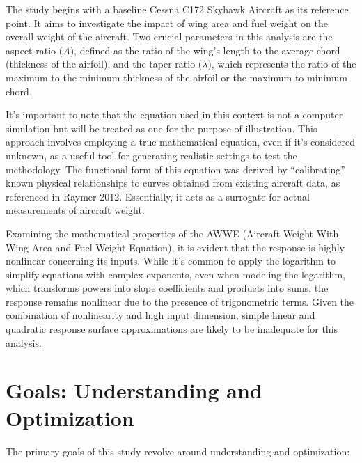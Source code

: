 \documentclass[
  letterpaper,
  DIV=11,
  numbers=noendperiod]{scrreprt}
\begin{document}
The study begins with a baseline Cessna C172 Skyhawk Aircraft as its
reference point. It aims to investigate the impact of wing area and fuel
weight on the overall weight of the aircraft. Two crucial parameters in
this analysis are the aspect ratio (\(A\)), defined as the ratio of the
wing's length to the average chord (thickness of the airfoil), and the
taper ratio (\(\lambda\)), which represents the ratio of the maximum to
the minimum thickness of the airfoil or the maximum to minimum chord.

It's important to note that the equation used in this context is not a
computer simulation but will be treated as one for the purpose of
illustration. This approach involves employing a true mathematical
equation, even if it's considered unknown, as a useful tool for
generating realistic settings to test the methodology. The functional
form of this equation was derived by ``calibrating'' known physical
relationships to curves obtained from existing aircraft data, as
referenced in Raymer 2012. Essentially, it acts as a surrogate for
actual measurements of aircraft weight.

Examining the mathematical properties of the AWWE (Aircraft Weight With
Wing Area and Fuel Weight Equation), it is evident that the response is
highly nonlinear concerning its inputs. While it's common to apply the
logarithm to simplify equations with complex exponents, even when
modeling the logarithm, which transforms powers into slope coefficients
and products into sums, the response remains nonlinear due to the
presence of trigonometric terms. Given the combination of nonlinearity
and high input dimension, simple linear and quadratic response surface
approximations are likely to be inadequate for this analysis.

\hypertarget{goals-understanding-and-optimization}{%
\section{Goals: Understanding and
Optimization}\label{goals-understanding-and-optimization}}

The primary goals of this study revolve around understanding and
optimization:
\end{document}
